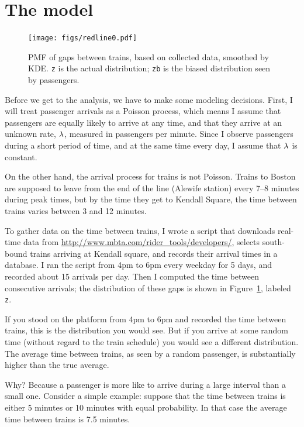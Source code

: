 \documentclass[12pt]{book}
\theoremstyle{exercise}
\newcommand{\py}[1]{{\tt #1}}%
\begin{document}
\section{The model}

\begin{figure}
\centerline{\texttt{[image: figs/redline0.pdf]}}
\caption{PMF of gaps between trains, based on collected data,
smoothed by KDE.  \py{z} is the actual distribution; \py{zb}
is the biased distribution seen by passengers. }
\label{fig.redline0}
\end{figure}

Before we get to the analysis, we have to make some
modeling decisions.  First, I will treat passenger arrivals as
a Poisson process, which means I assume that passengers are equally
likely to arrive at any time, and that they arrive at an unknown
rate, $\mathtt{\lambda}$, measured in passengers per minute.  Since I
observe passengers during a short period of time, and at the same
time every day, I assume that $\mathtt{\lambda}$ is constant.

On the other hand, the arrival process for trains is not Poisson.
Trains to Boston are supposed to leave from the end of the line
(Alewife station) every 7--8 minutes during peak times, but by the time
they get to Kendall Square, the time between trains varies between 3
and 12 minutes.

To gather data on the time between trains, I wrote a script that
downloads real-time data from
\url{http://www.mbta.com/rider_tools/developers/}, selects south-bound
trains arriving at Kendall square, and records their arrival times
in a database.  I ran the script from 4pm to 6pm every weekday
for 5 days, and recorded about 15 arrivals per day.  Then
I computed the time between consecutive arrivals; the distribution
of these gaps is shown in Figure~\ref{fig.redline0}, labeled \py{z}.

If you stood on the platform from 4pm to 6pm and recorded the time
between trains, this is the distribution you would see.  But if you
arrive at some random time (without regard to the train schedule) you
would see a different distribution.  The average time
between trains, as seen by a random passenger, is substantially
higher than the true average.

Why?  Because a passenger is more like to arrive during a
large interval than a small one.  Consider a simple example:
suppose that the time between trains is either 5 minutes
or 10 minutes with equal probability.  In that case
the average time between
trains is 7.5 minutes.
\end{document}
